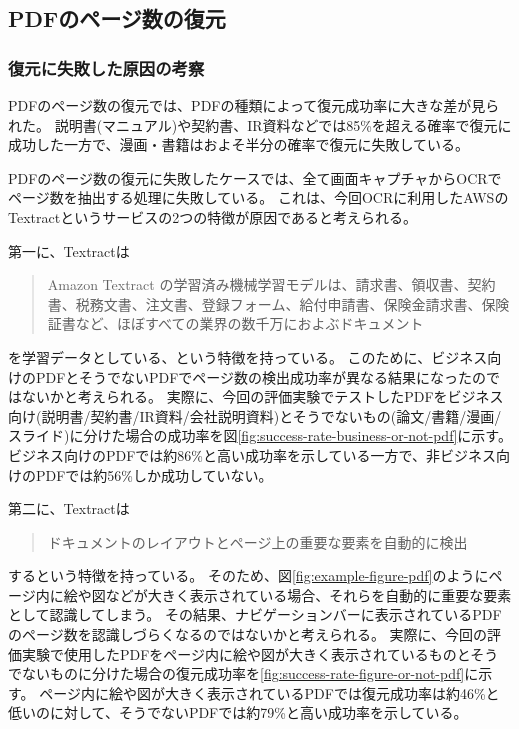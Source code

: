 
\subsection{PDFのページ数の復元}

\subsubsection{復元に失敗した原因の考察}
PDFのページ数の復元では、PDFの種類によって復元成功率に大きな差が見られた。
説明書(マニュアル)や契約書、IR資料などでは85\%を超える確率で復元に成功した一方で、漫画・書籍はおよそ半分の確率で復元に失敗している。

PDFのページ数の復元に失敗したケースでは、全て画面キャプチャからOCRでページ数を抽出する処理に失敗している。
これは、今回OCRに利用したAWSのTextractというサービスの2つの特徴が原因であると考えられる。

第一に、Textractは
\begin{quote}
Amazon Textract の学習済み機械学習モデルは、請求書、領収書、契約書、税務文書、注文書、登録フォーム、給付申請書、保険金請求書、保険証書など、ほぼすべての業界の数千万におよぶドキュメント
\end{quote}
を学習データとしている、という特徴を持っている\cite{textract}。
このために、ビジネス向けのPDFとそうでないPDFでページ数の検出成功率が異なる結果になったのではないかと考えられる。
実際に、今回の評価実験でテストしたPDFをビジネス向け(説明書/契約書/IR資料/会社説明資料)とそうでないもの(論文/書籍/漫画/スライド)に分けた場合の成功率を図\ref{fig:success-rate-business-or-not-pdf}に示す。
ビジネス向けのPDFでは約86\%と高い成功率を示している一方で、非ビジネス向けのPDFでは約56\%しか成功していない。

第二に、Textractは
\begin{quote}
ドキュメントのレイアウトとページ上の重要な要素を自動的に検出
\end{quote}
するという特徴を持っている。
そのため、図\ref{fig:example-figure-pdf}\cite{example-pdf}のようにページ内に絵や図などが大きく表示されている場合、それらを自動的に重要な要素として認識してしまう。
その結果、ナビゲーションバーに表示されているPDFのページ数を認識しづらくなるのではないかと考えられる。
実際に、今回の評価実験で使用したPDFをページ内に絵や図が大きく表示されているものとそうでないものに分けた場合の復元成功率を\ref{fig:success-rate-figure-or-not-pdf}に示す。
ページ内に絵や図が大きく表示されているPDFでは復元成功率は約46\%と低いのに対して、そうでないPDFでは約79\%と高い成功率を示している。

